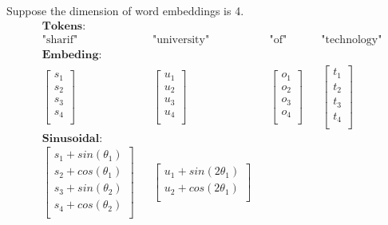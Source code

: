 \documentclass{article}
\begin{document}
\subsection{}
Suppose the dimension of word embeddings is 4.
\begin{align*}
    &\textbf{Tokens:}\\ 
    &\text{"sharif"} &&\text{"university"} &&\text{"of"} &&\text{"technology"}\\
    &\textbf{Embeding:}\\ 
    &\begin{bmatrix}
        s_1 \\
        s_2 \\
        s_3 \\
        s_4 \\
    \end{bmatrix}
    &&\begin{bmatrix}
        u_1 \\
        u_2 \\
        u_3 \\
        u_4 \\
    \end{bmatrix}
    &&\begin{bmatrix}
        o_1 \\
        o_2 \\
        o_3 \\
        o_4 \\
    \end{bmatrix}
    &&
    \begin{bmatrix}
        t_1 \\
        t_2 \\
        t_3 \\
        t_4 \\
    \end{bmatrix} \\
    &\textbf{Sinusoidal:} \\
    &\begin{bmatrix}
        s_1 + sin(\theta_1)\\
        s_2 + cos(\theta_1)\\
        s_3 + sin(\theta_2)\\
        s_4 + cos(\theta_2)\\
    \end{bmatrix}
    &&\begin{bmatrix}
        u_1 + sin(2\theta_1)\\
        u_2 + cos(2\theta_1)\\

\end{bmatrix}
\end{align*}
\end{document}
